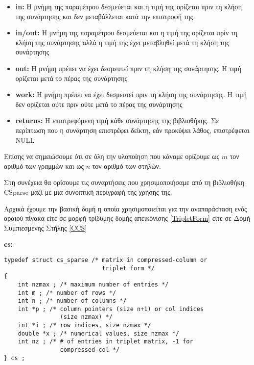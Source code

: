 \begin{itemize}
  \item \textbf{in:}  Η μνήμη της παραμέτρου δεσμεύεται και η τιμή της ορίζεται πριν τη κλήση της συνάρτησης και δεν μεταβάλλεται κατά την επιστροφή της 
  \item \textbf{in/out:}  Η μνήμη της παραμέτρου δεσμεύεται και η τιμή της ορίζεται πρίν τη κλήση της συνάρτησης αλλά η τιμή της έχει μεταβληθεί μετά τη κλήση της συνάρτησης 
  \item \textbf{out:}  Η μνήμη πρέπει να έχει δεσμευτεί πριν τη κλήση της συνάρτησης. Η τιμή ορίζεται μετά το πέρας της συνάρτησης 
  \item \textbf{work:}   Η μνήμη πρέπει να έχει δεσμευτεί πριν τη κλήση της συνάρτησης. Η τιμή δεν ορίζεται ούτε πριν ούτε μετά το πέρας της συνάρτησης  
  \item \textbf{returns:}  Η επιστρεφόμενη τιμή κάθε συνάρτησης της βιβλιοθήκης. Σε περίπτωση που η συνάρτηση επιστρέφει δείκτη, εάν προκύψει λάθος, επιστρέφεται NULL
\end{itemize}

 Επίσης να σημειώσουμε ότι σε όλη την υλοποίηση που κάναμε ορίζουμε ως $m$ τον αριθμό των γραμμών και ως $n$ τον αριθμό των στηλών.

Στη συνέχεια θα ορίσουμε τις συναρτήσεις που χρησιμοποιήσαμε από τη βιβλιοθήκη \textlatin{CSparse} μαζί με μια συνοπτική περιγραφή της χρήσης της.

Αρχικά έχουμε την βασική δομή η οποία χρησιμοποιείται για την αναπαράσταση ενός αραιού πίνακα είτε σε μορφή τρίδυμης δομής απεικόνισης \ref{TripletForm} είτε σε Δομή Συμπιεσμένης Στήλης \ref{CCS}

\textbf{cs:}
\begin{verbatim}
typedef struct cs_sparse /* matrix in compressed-column or
                            triplet form */
{
    int nzmax ; /* maximum number of entries */
    int m ; /* number of rows */
    int n ; /* number of columns */
    int *p ; /* column pointers (size n+1) or col indices
                (size nzmax) */
    int *i ; /* row indices, size nzmax */
    double *x ; /* numerical values, size nzmax */
    int nz ; /* # of entries in triplet matrix, -1 for
                compressed-col */
} cs ;
\end{verbatim}

